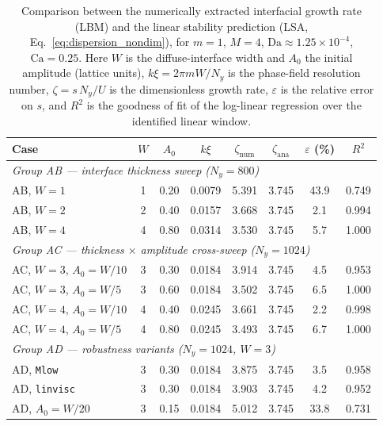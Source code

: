 \begin{table}[!ht]
\centering
\caption{Comparison between the numerically extracted interfacial growth rate (LBM) and the linear stability prediction (LSA, Eq.~\eqref{eq:dispersion_nondim}), for $m=1$, $M=4$, $\mathrm{Da}\approx1.25\times10^{-4}$, $\mathrm{Ca}=0.25$. Here $W$ is the diffuse-interface width and $A_0$ the initial amplitude (lattice units), $k\xi = 2\pi m W/N_y$ is the phase-field resolution number, $\zeta = s\,N_y/U$ is the dimensionless growth rate, $\varepsilon$ is the relative error on $s$, and $R^2$ is the goodness of fit of the log-linear regression over the identified linear window.}
\label{tab:comparacao_lsa}
\small
\begin{tabular}{l c c c c c c c}
\hline
Case & $W$ & $A_0$ & $k\xi$ & $\zeta_{\mathrm{num}}$ & $\zeta_{\mathrm{ana}}$ & $\varepsilon$ (\%) & $R^2$ \\
\hline
\multicolumn{8}{l}{\textit{Group AB --- interface thickness sweep ($N_y = 800$)}}\\
AB, $W{=}1$        & 1 & 0.20 & 0.0079 & 5.391 & 3.745 & 43.9 & 0.749 \\
AB, $W{=}2$        & 2 & 0.40 & 0.0157 & 3.668 & 3.745 &  2.1 & 0.994 \\
AB, $W{=}4$        & 4 & 0.80 & 0.0314 & 3.530 & 3.745 &  5.7 & 1.000 \\
\hline
\multicolumn{8}{l}{\textit{Group AC --- thickness $\times$ amplitude cross-sweep ($N_y = 1024$)}}\\
AC, $W{=}3$, $A_0{=}W/10$ & 3 & 0.30 & 0.0184 & 3.914 & 3.745 &  4.5 & 0.953 \\
AC, $W{=}3$, $A_0{=}W/5$  & 3 & 0.60 & 0.0184 & 3.502 & 3.745 &  6.5 & 1.000 \\
AC, $W{=}4$, $A_0{=}W/10$ & 4 & 0.40 & 0.0245 & 3.661 & 3.745 &  2.2 & 0.998 \\
AC, $W{=}4$, $A_0{=}W/5$  & 4 & 0.80 & 0.0245 & 3.493 & 3.745 &  6.7 & 1.000 \\
\hline
\multicolumn{8}{l}{\textit{Group AD --- robustness variants ($N_y = 1024$, $W = 3$)}}\\
AD, \texttt{Mlow}     & 3 & 0.30 & 0.0184 & 3.875 & 3.745 &  3.5 & 0.958 \\
AD, \texttt{linvisc}  & 3 & 0.30 & 0.0184 & 3.903 & 3.745 &  4.2 & 0.952 \\
AD, $A_0{=}W/20$      & 3 & 0.15 & 0.0184 & 5.012 & 3.745 & 33.8 & 0.731 \\
\hline
\end{tabular}
\end{table}

